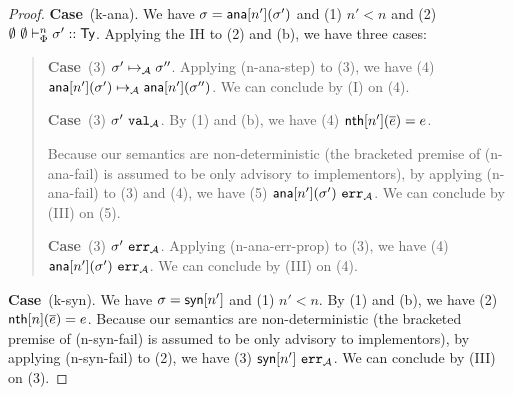 \documentclass[12pt]{article}
\newcommand{\pfcase}[1]{\textbf{Case}~#1. }
\begin{document}
\begin{proof}




\pfcase{(k-ana)} We have $\sigma={\sf ana}[n'](\sigma')$ and (1) $n' < n$ and (2) $\emptyset~\emptyset \vdash_{\Phi}^{n} \sigma' :: {\sf Ty}$. Applying the IH to (2) and (b), we have three cases:
\begin{quote}
    \pfcase{(3) $\sigma' \mapsto_{\mathcal{A}} \sigma''$} Applying (n-ana-step) to (3), we have (4) ${\sf ana}[n'](\sigma') \mapsto_{\mathcal{A}} {\sf ana}[n'](\sigma'')$. We can conclude by (I) on (4).

    \pfcase{(3) $\sigma'~\mathtt{val}_{\mathcal{A}}$} By (1) and (b), we have (4) ${\sf nth}[n'](\overline{e})=e$.

    Because our semantics are non-deterministic (the bracketed premise of (n-ana-fail) is assumed to be only advisory to implementors), by applying (n-ana-fail) to (3) and (4), we have (5) ${\sf ana}[n'](\sigma')~\mathtt{err}_{\mathcal{A}}$. We can conclude by (III) on (5).

    \pfcase{(3) $\sigma'~\mathtt{err}_{\mathcal{A}}$} Applying (n-ana-err-prop) to (3), we have (4) ${\sf ana}[n'](\sigma')~\mathtt{err}_{\mathcal{A}}$. We can conclude by (III) on (4).
\end{quote}

\pfcase{(k-syn)} We have $\sigma={\sf syn}[n']$ and (1) $n' < n$. By (1) and (b), we have (2) ${\sf nth}[n](\overline{e})=e$. Because our semantics are non-deterministic (the bracketed premise of (n-syn-fail) is assumed to be only advisory to implementors), by applying (n-syn-fail) to (2), we have (3) ${\sf syn}[n']~\mathtt{err}_{\mathcal{A}}$. We can conclude by (III) on (3).
\end{proof}
\end{document}
